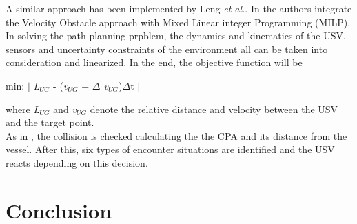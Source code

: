 \documentclass[journal]{IEEEtran}
\begin{document}
  \indent A similar approach has been implemented by Leng \textit{et al.}. In \cite{Leng2013} the authors integrate the Velocity Obstacle approach with Mixed Linear integer Programming (MILP). In solving the path planning prpblem, the dynamics and kinematics of the USV, sensors and uncertainty constraints of the environment all can be taken into consideration and linearized. In the end, the objective function will be
      \begin{center}
        min: $ \mid $ \textit{L$_{UG}$} - (\textit{v$_{UG}$} + \textit{$\Delta$ v$_{UG}$})$\Delta$t $ \mid$
      \end{center}
  where \textit{L$_{UG}$} and \textit{v$_{UG}$} denote the relative distance and velocity between the USV and the target point.\\
  As in \cite{Kuwata2014}, the collision is checked calculating the the CPA and its distance from the vessel. After this, six types of encounter situations are identified and the USV reacts depending on this decision.





\section{Conclusion} \label{conclusion}



\ifCLASSOPTIONcaptionsoff
  \newpage
\fi


%
%
%







\end{document}
